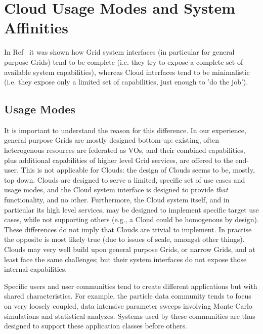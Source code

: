 \documentclass{article}
\newcommand{\I}[1]{\textit{#1}}
\newcommand{\amnote}[1]{   {\textcolor{magenta}{ ***Andre:    #1 }}}
\newcommand{\amnote}[1]{}
\begin{document}
\section{Cloud Usage Modes and System Affinities}
\label{sec:affine}
 
 
In Ref~\cite{cloud-saga-paper} it was shown how Grid system interfaces
(in particular for general purpose Grids) tend to be complete
(i.e. they try to expose a complete set of available system
capabilities), whereas Cloud interfaces tend to be minimalistic
(i.e. they expose only a limited set of capabilities, just enough to
'do the job').
 
 \subsection{Usage Modes}

  It is important to understand the reason for this difference.  In
  our experience, general purpose Grids are mostly designed bottom-up:
  existing, often heterogenous resources are federated as VOs, and
  their combined capabilities, plus additional capabilities of higher
  level Grid services, are offered to the end-user.  This is not
  applicable for Clouds: the design of Clouds seems to be, mostly, top
  down. Clouds are designed to serve a limited, specific set of use
  cases and usage modes, and the Cloud system interface is designed to
  provide \I{that} functionality, and no other.  Furthermore, the
  Cloud system itself, and in particular its high level services, may
  be designed to implement specific target use cases, while not
  supporting others (e.g., a Cloud could be homogenous by design).
  These differences do not imply that Clouds are trivial to implement.
  In practise the opposite is most likely true (due to issues of
  scale, amongst other things). Clouds may very well build upon
  general purpose Grids, or narrow Grids, and at least face the same
  challenges; but their system interfaces do not expose those internal
  capabilities.

  Specific users and user communities tend to create different
  applications but with shared characteristics.  For example, the
  particle data community tends to focus on very loosely coupled, data
  intensive parameter sweeps involving Monte Carlo simulations and
  statistical analyzes.  Systems used by these communities are thus
  designed to support these application classes before others.
  
\end{document}
